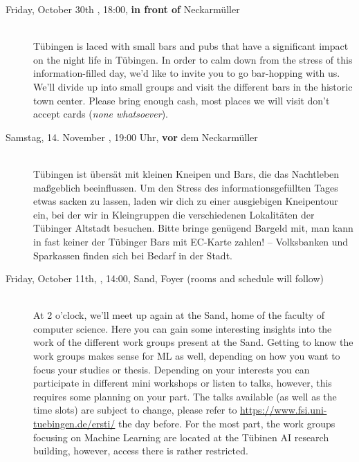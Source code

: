 \begin{description}
    \fi
    \ifmaster
    \fi
\fi

\ifml
	\item[Friday, October 30th \YEAR, 18:00, \textbf{in front of} Neckarmüller]\ \\
        Tübingen is laced with small bars and pubs that have a significant impact on the night life in Tübingen. In order to calm down from the stress of this information-filled day, we'd like to invite you to go bar-hopping with us. We'll divide up into small groups and visit the different bars in the historic town center. Please bring enough cash, most places we will visit don't accept cards (\emph{none whatsoever}).

	\else
	\item[Samstag, 14. November \YEAR, 19:00 Uhr, \textbf{vor} dem Neckarmüller]\ \\
        Tübingen ist übersät mit kleinen Kneipen und Bars, die das Nachtleben maßgeblich beeinflussen. Um den Stress des informationsgefüllten Tages etwas sacken zu lassen, laden wir dich zu einer ausgiebigen Kneipentour ein, bei der wir in Kleingruppen die verschiedenen Lokalitäten der Tübinger Altstadt besuchen. Bitte bringe genügend Bargeld mit, man kann in fast keiner der Tübinger Bars mit EC-Karte zahlen! -- Volksbanken und Sparkassen finden sich bei Bedarf in der Stadt.
\fi

\ifwintersemester
    \ifml
	    \item[Friday, October 11th, \YEAR, 14:00, Sand, Foyer (rooms and schedule will follow)]\ \\
    	At 2 o'clock, we'll meet up again at the Sand, home of the faculty of computer science. %
    	Here you can gain some interesting insights into the work of the different work groups present at the Sand.
	    Getting to know the work groups makes sense for ML as well, depending on how you want to focus your studies or thesis. Depending on your interests you can participate in different mini workshops or listen to talks, however, this requires some planning on your part. The talks available (as well as the time slots) are subject to change, please refer to \url{https://www.fsi.uni-tuebingen.de/ersti/} the day before.
    	For the most part, the work groups focusing on Machine Learning are located at the Tübinen AI research building, however, access there is rather restricted.


\end{description}
